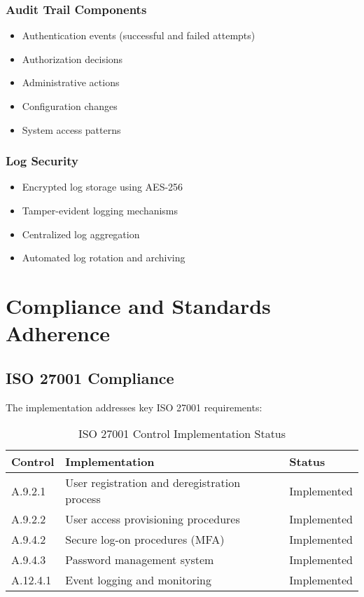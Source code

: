 \documentclass[12pt,a4paper]{article}
\begin{document}
\subsubsection{Audit Trail Components}
\begin{itemize}
    \item Authentication events (successful and failed attempts)
    \item Authorization decisions
    \item Administrative actions
    \item Configuration changes
    \item System access patterns
\end{itemize}

\subsubsection{Log Security}
\begin{itemize}
    \item Encrypted log storage using AES-256
    \item Tamper-evident logging mechanisms
    \item Centralized log aggregation
    \item Automated log rotation and archiving
\end{itemize}

\section{Compliance and Standards Adherence}

\subsection{ISO 27001 Compliance}
The implementation addresses key ISO 27001 requirements:

\begin{table}[H]
\centering
\begin{tabularx}{\textwidth}{|l|X|l|}
\hline
\textbf{Control} & \textbf{Implementation} & \textbf{Status} \\
\hline
A.9.2.1 & User registration and deregistration process & Implemented \\
\hline
A.9.2.2 & User access provisioning procedures & Implemented \\
\hline
A.9.4.2 & Secure log-on procedures (MFA) & Implemented \\
\hline
A.9.4.3 & Password management system & Implemented \\
\hline
A.12.4.1 & Event logging and monitoring & Implemented \\
\hline
\end{tabularx}
\caption{ISO 27001 Control Implementation Status}
\label{tab:iso27001}
\end{table}
\end{document}
